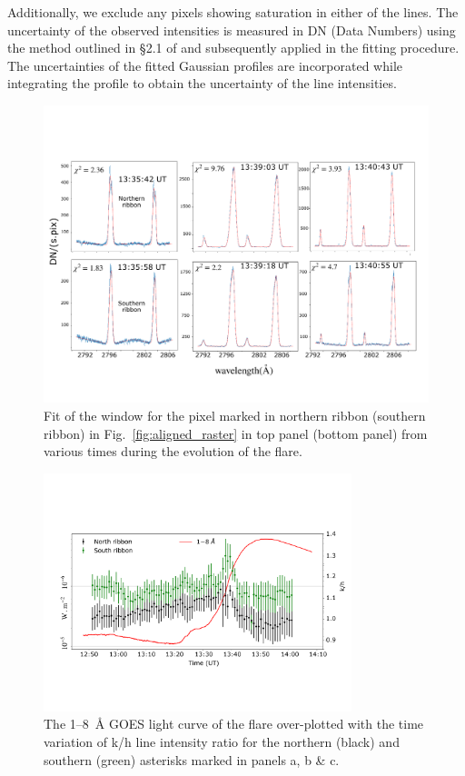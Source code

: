 Additionally, we exclude any pixels showing saturation in either of the lines. The uncertainty of the observed intensities is measured in DN (Data Numbers) using the method outlined in \S2.1 of \cite{kerr15} and subsequently applied in the fitting procedure. The uncertainties of the fitted Gaussian profiles are incorporated while integrating the profile to obtain the uncertainty of the line intensities.

\begin{figure}[ht!]
    \centering
    \includegraphics[trim={0cm 3cm 0.5cm 3cm},clip,width=\textwidth]{Figures/pix_fit.pdf}
    \caption{Fit of the   window for the pixel marked in northern ribbon (southern ribbon) in Fig.~\ref{fig:aligned_raster} in top panel (bottom panel) from various times during the evolution of the flare. }
    \label{fig:pix_fit_ribbon}
\end{figure}

\begin{figure}[ht!]
\centering  
\includegraphics[trim={1.5cm 4cm 0.5cm 4cm},clip,width=0.8\textwidth]{Figures/m_flare_iris_pt2.pdf}
\caption{The 1{--}8~{\AA} GOES light curve of the flare over-plotted with the time variation of   k/h line intensity ratio for the northern (black) and southern (green) asterisks marked in panels a, b \& c.}
\label{fig:aligned_iris_ratio}
\end{figure}

